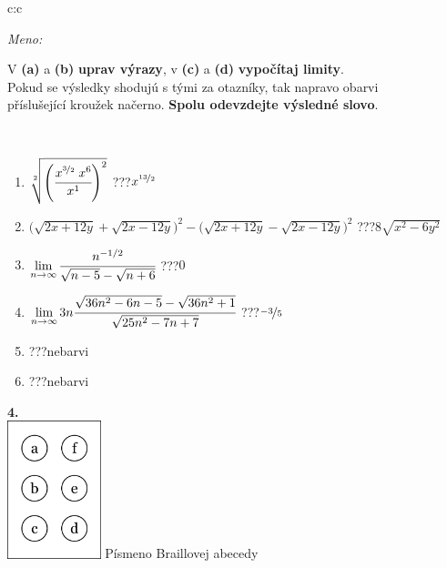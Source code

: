 \documentclass[10pt]{report}
\begin{document}
\begin{tabular}{c:c}
\begin{minipage}[c][104.5mm][t]{0.5\linewidth}
\begin{center}
\textit{Meno:}\phantom{xxxxxxxxxxxxxxxxxxxxxxxxxxxxxxxxxxxxxxxxxxxxxxxxxxxxxxxxxxxxxxxxx}\\[5mm]
\begin{minipage}{0.95\linewidth}
\begin{center}
V \textbf{(a)} a \textbf{(b)} \textbf{uprav výrazy}, v \textbf{(c)} a \textbf{(d)} \textbf{vypočítaj limity}.\\Pokud se výsledky shodujú s tými za otazníky, tak napravo obarvi\\příslušející kroužek načerno. \textbf{Spolu odevzdejte výsledné slovo}.
\end{center}
\end{minipage}
\\[1mm]
\begin{minipage}{0.79\linewidth}
\begin{center}
\begin{varwidth}{\linewidth}
\begin{enumerate}
\small
\item $\sqrt[2]{\left(\cfrac{x^{\nicefrac{3}{2}}\;x^{6}}{x^{1}}\right)^{2}}$\quad \dotfill\; ???\;\dotfill \quad $x^{\nicefrac{13}{2}}$
\item {\footnotesize{\scriptsize$\big(\sqrt{2x+12y}+\sqrt{2x-12y}\big)^2-\big(\sqrt{2x+12y}-\sqrt{2x-12y}\big)^2$}\quad \dotfill\; ???\;\dotfill \quad $8\sqrt{x^2-6y^2}$}
\item $\lim\limits_{n\to\infty}\cfrac{n^{-1/2}}{\sqrt{n-5}-\sqrt{n+6}}$\quad \dotfill\; ???\;\dotfill \quad $0$
\item $\lim\limits_{n\to\infty}3n\cfrac{\sqrt{36n^2-6n-5}-\sqrt{36n^2+1}}{\sqrt{25n^2-7n+7}}$\quad \dotfill\; ???\;\dotfill \quad $\nicefrac{-3}{5}$
\item \quad \dotfill\; ???\;\dotfill \quad nebarvi
\item \quad \dotfill\; ???\;\dotfill \quad nebarvi
\end{enumerate}
\end{varwidth}
\end{center}
\end{minipage}
\begin{minipage}{0.20\linewidth}
\begin{center}
{\Huge\bfseries 4.} \\[2mm]
\includegraphics[height=40mm]{../images/braille.png}
{\small Písmeno Braillovej abecedy}
\end{center}
\end{minipage}
\end{center}
\end{minipage}
%
\end{tabular}
\end{document}
